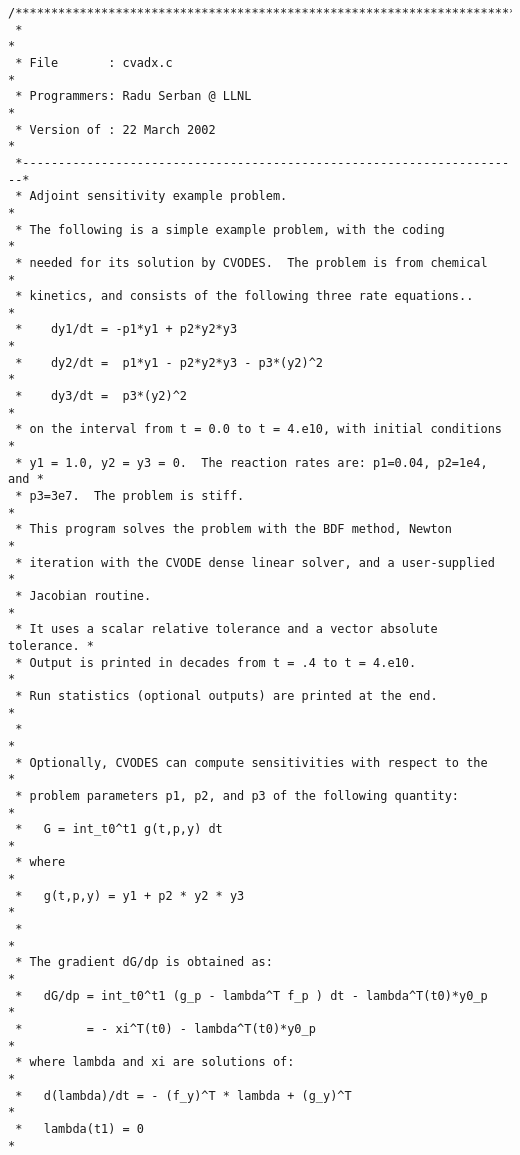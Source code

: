 \begin{verbatim}
/************************************************************************
 *                                                                      *
 * File       : cvadx.c                                                 *
 * Programmers: Radu Serban @ LLNL                                      *
 * Version of : 22 March 2002                                           *
 *----------------------------------------------------------------------*
 * Adjoint sensitivity example problem.                                 *
 * The following is a simple example problem, with the coding           *
 * needed for its solution by CVODES.  The problem is from chemical     *
 * kinetics, and consists of the following three rate equations..       *
 *    dy1/dt = -p1*y1 + p2*y2*y3                                        *
 *    dy2/dt =  p1*y1 - p2*y2*y3 - p3*(y2)^2                            *
 *    dy3/dt =  p3*(y2)^2                                               *
 * on the interval from t = 0.0 to t = 4.e10, with initial conditions   *
 * y1 = 1.0, y2 = y3 = 0.  The reaction rates are: p1=0.04, p2=1e4, and *
 * p3=3e7.  The problem is stiff.                                       *
 * This program solves the problem with the BDF method, Newton          *
 * iteration with the CVODE dense linear solver, and a user-supplied    *
 * Jacobian routine.                                                    * 
 * It uses a scalar relative tolerance and a vector absolute tolerance. *
 * Output is printed in decades from t = .4 to t = 4.e10.               *
 * Run statistics (optional outputs) are printed at the end.            *
 *                                                                      *
 * Optionally, CVODES can compute sensitivities with respect to the     *
 * problem parameters p1, p2, and p3 of the following quantity:         *
 *   G = int_t0^t1 g(t,p,y) dt                                          *
 * where                                                                *
 *   g(t,p,y) = y1 + p2 * y2 * y3                                       *
 *                                                                      *
 * The gradient dG/dp is obtained as:                                   *
 *   dG/dp = int_t0^t1 (g_p - lambda^T f_p ) dt - lambda^T(t0)*y0_p     *
 *         = - xi^T(t0) - lambda^T(t0)*y0_p                             *
 * where lambda and xi are solutions of:                                *
 *   d(lambda)/dt = - (f_y)^T * lambda + (g_y)^T                        *
 *   lambda(t1) = 0                                                     *

\end{verbatim}
